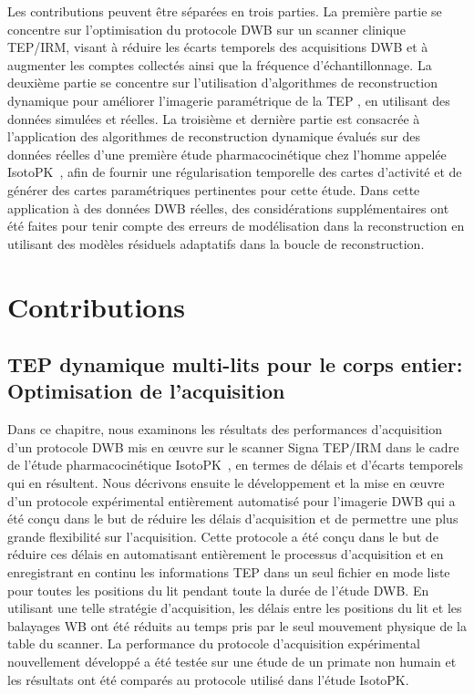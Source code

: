 Les contributions peuvent être séparées en trois parties. La première partie se concentre sur l'optimisation du protocole DWB sur un scanner clinique TEP/IRM, visant à réduire les écarts temporels des acquisitions DWB et à augmenter les comptes collectés ainsi que la fréquence d'échantillonnage. 
La deuxième partie se concentre sur l'utilisation d'algorithmes de reconstruction dynamique pour améliorer l'imagerie paramétrique de la TEP , en utilisant des données simulées et réelles.
La troisième et dernière partie est consacrée à l'application des algorithmes de reconstruction dynamique évalués sur des données réelles d'une première étude pharmacocinétique chez l'homme appelée IsotoPK~\cite{Marie2019}, afin de fournir une régularisation temporelle des cartes d'activité et de générer des cartes paramétriques pertinentes pour cette étude.
Dans cette application à des données DWB réelles, des considérations supplémentaires ont été faites pour tenir compte des erreurs de modélisation dans la reconstruction en utilisant des modèles résiduels adaptatifs dans la boucle de reconstruction.

\section*{Contributions}
\subsection*{TEP dynamique multi-lits pour le corps entier: Optimisation de l'acquisition}
Dans ce chapitre, nous examinons les résultats des performances d'acquisition d'un protocole DWB mis en œuvre sur le scanner Signa TEP/IRM dans le cadre de l'étude pharmacocinétique IsotoPK~\cite{Marie2019}, en termes de délais et d'écarts temporels qui en résultent.
Nous décrivons ensuite le développement et la mise en œuvre d'un protocole expérimental entièrement automatisé pour l'imagerie DWB qui a été conçu dans le but de réduire les délais d'acquisition et de permettre une plus grande flexibilité sur l'acquisition. Cette protocole a été conçu dans le but de réduire ces délais en automatisant entièrement le processus d'acquisition et en enregistrant en continu les informations TEP dans un seul fichier en mode liste pour toutes les positions du lit pendant toute la durée de l'étude DWB.
En utilisant une telle stratégie d'acquisition, les délais entre les positions du lit et les balayages WB ont été réduits au temps pris par le seul mouvement physique de la table du scanner. 
La performance du protocole d'acquisition expérimental nouvellement développé a été testée sur une étude de un primate non humain et les résultats ont été comparés au protocole utilisé dans l'étude IsotoPK.

